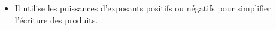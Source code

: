 \begin{prerequis}[Objectifs de 3\up{e}]  
    \begin{itemize}  
        \item Il utilise les puissances d’exposants positifs ou négatifs pour simplifier l’écriture des produits.
    \end{itemize}
\end{prerequis}
